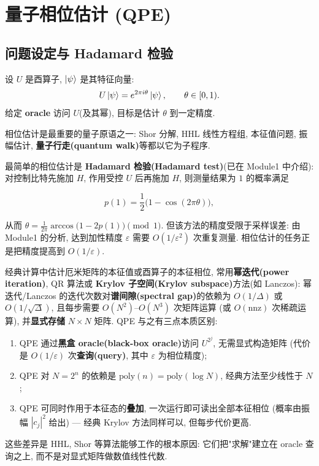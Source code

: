 \documentclass[utf8]{article} %
\numberwithin{equation}{section}   %
\newtheorem{Def}{\hskip 2em {\color{green} 定义}}[subsection]
\newtheorem{Note}{\hskip 2em {\color{red} 注}}[subsection]
\begin{document}
\section{量子相位估计 (QPE)}

\subsection{问题设定与 Hadamard 检验}

\begin{Def}[相位估计问题]
    设 $U$ 是酉算子, $\ket{\psi}$ 是其特征向量:
    \begin{equation}
        U \ket{\psi} = e^{2\pi i \theta} \ket{\psi}, \qquad \theta \in [0, 1).
    \end{equation}
    给定 \textbf{oracle} 访问 $U$(及其幂), 目标是估计 $\theta$ 到一定精度.
\end{Def}

\begin{Note}
    相位估计是最重要的量子原语之一: Shor 分解, HHL 线性方程组, 本征值问题, 振幅估计, 
    \textbf{量子行走(quantum walk)}等都以它为子程序.
\end{Note}

最简单的相位估计是 \textbf{Hadamard 检验(Hadamard test)}(已在 Module1 中介绍): 对控制比特先施加
$H$, 作用受控 $U$ 后再施加 $H$, 则测量结果为 $1$ 的概率满足

\begin{equation}
    p(1) = \frac{1}{2}\big(1 - \cos(2\pi\theta)\big),
\end{equation}

从而 $\theta = \frac{1}{2\pi}\arccos\big(1 - 2p(1)\big) \pmod 1$.
但该方法的精度受限于采样误差: 由 Module1 的分析, 达到加性精度 $\varepsilon$
需要 $O(1/\varepsilon^2)$ 次重复测量. 相位估计的任务正是把精度提高到 $O(1/\varepsilon)$.

\begin{Note}
    经典计算中估计厄米矩阵的本征值或酉算子的本征相位, 常用\textbf{幂迭代(power iteration)},
    QR 算法或 \textbf{Krylov 子空间(Krylov subspace)}方法(如 Lanczos): 幂迭代/Lanczos 的迭代次数对\textbf{谱间隙(spectral gap)}的依赖为
    $O(1/\Delta)$ 或 $O(1/\sqrt{\Delta})$, 且每步需要 $O(N^2)$--$O(N^3)$ 次矩阵运算
    (或 $O(\mathrm{nnz})$ 次稀疏运算), 并\textbf{显式存储} $N \times N$ 矩阵.
    QPE 与之有三点本质区别:
    \begin{enumerate}
        \item QPE 通过\textbf{黑盒 oracle(black-box oracle)}访问 $U^{2^j}$, 无需显式构造矩阵
        (代价是 $O(1/\varepsilon)$ 次\textbf{查询(query)}, 其中 $\varepsilon$ 为相位精度);
        \item QPE 对 $N = 2^n$ 的依赖是 $\mathrm{poly}(n) = \mathrm{poly}(\log N)$,
        经典方法至少线性于 $N$;
        \item QPE 可同时作用于本征态的\textbf{叠加}, 一次运行即可读出全部本征相位
        (概率由振幅 $|c_j|^2$ 给出) --- 经典 Krylov 方法同样可以, 但每步代价更高.
    \end{enumerate}
    这些差异是 HHL, Shor 等算法能够工作的根本原因: 它们把"求解"建立在
    oracle 查询之上, 而不是对显式矩阵做数值线性代数.
\end{Note}
\end{document}
